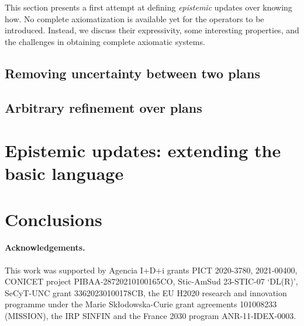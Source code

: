 \documentclass[sn-mathphys-num]{sn-jnl}%
\begin{document}
This section presents a first attempt at defining \emph{epistemic} updates over knowing how.  No complete axiomatization is available yet for the operators to be introduced. Instead, we  discuss their expressivity, some interesting properties, and the challenges in obtaining complete axiomatic systems. 

\subsection{Removing uncertainty between two plans}
\label{sec:ref}


\subsection{Arbitrary refinement over plans}
\label{sec:aref}


% 

\section{Epistemic updates: extending the basic language}
\label{sec:extension}









% 



% 

\section{Conclusions}
\label{sec:final}


\paragraph{Acknowledgements.} 
This work was supported by Agencia I+D+i grants
 PICT 2020-3780,
 2021-00400, CONICET project PIBAA-28720210100165CO, 
 Stic-AmSud 23-STIC-07 ‘DL(R)', 
 SeCyT-UNC grant 33620230100178CB, 
 the EU
H2020 research and innovation programme under the
Marie Skłodowska-Curie grant agreements 101008233
(MISSION), the IRP SINFIN
and the France 2030 program ANR-11-IDEX-0003.
\end{document}
